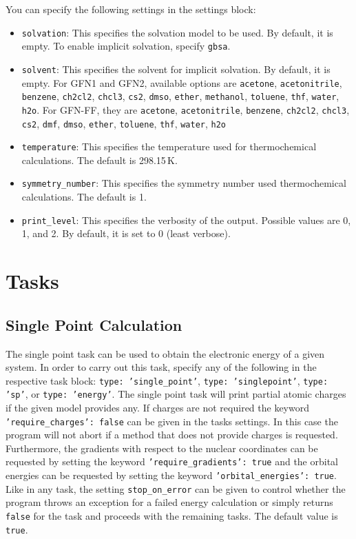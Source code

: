 \documentclass[]{tufte-book}
\begin{document}
You can specify the following settings in the settings block:
\begin{itemize}
\item \texttt{solvation}: This specifies the solvation model to be used. By default, it is empty. To enable implicit solvation, specify \texttt{gbsa}.
\item \texttt{solvent}: This specifies the solvent for implicit solvation. By default, it is empty. For GFN1 and GFN2, available options are \texttt{acetone}, \texttt{acetonitrile},
\texttt{benzene}, \texttt{ch2cl2}, \texttt{chcl3}, \texttt{cs2}, \texttt{dmso}, \texttt{ether}, \texttt{methanol}, \texttt{toluene}, \texttt{thf}, \texttt{water}, \texttt{h2o}. For
GFN-FF, they are \texttt{acetone}, \texttt{acetonitrile}, \texttt{benzene}, \texttt{ch2cl2}, \texttt{chcl3}, \texttt{cs2}, \texttt{dmf}, \texttt{dmso}, \texttt{ether}, \texttt{toluene},
\texttt{thf}, \texttt{water}, \texttt{h2o}
\item \texttt{temperature}: This specifies the temperature used for thermochemical calculations. The default is 298.15\,K.
\item \texttt{symmetry\_number}: This specifies the symmetry number used thermochemical calculations. The default is 1.
\item \texttt{print\_level}: This specifies the verbosity of the output. Possible values are 0, 1, and 2. By default, it is set to 0 (least verbose).
\end{itemize}


\section{Tasks}

\subsection{Single Point Calculation}

The single point task can be used to obtain the electronic energy of a given system. In order to carry out this task,
specify any of the following in the respective task block: \texttt{type: 'single\_point'}, \texttt{type: 'singlepoint'},
\texttt{type: 'sp'}, or \texttt{type: 'energy'}. The single point task will print partial atomic charges if the given
model provides any. If charges are not required the keyword \texttt{'require\_charges': false} can be given in the tasks
settings. In this case the program will not abort if a method that does not provide charges is requested.
Furthermore, the gradients with respect to the nuclear coordinates can be requested by setting the keyword \texttt{'require\_gradients': true}
and the orbital energies can be requested by setting the keyword \texttt{'orbital\_energies': true}.
Like in any task, the setting \texttt{stop\_on\_error} can be given to control whether the program throws an exception for a failed energy calculation or simply returns \texttt{false} for the task and proceeds with the remaining tasks. The default value is \texttt{true}.
\end{document}
